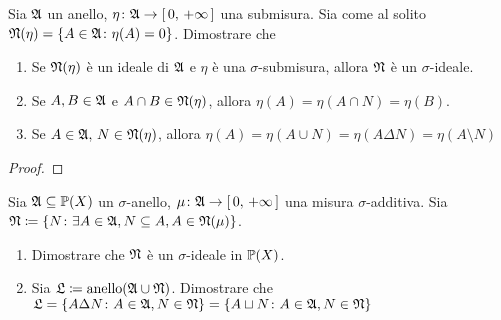 \documentclass[../EserciziIstituzioniAnalisi.tex]{subfiles}
\begin{document}
\begin{exercise}[2016-10-20]
  Sia $\mathfrak A$ un anello, $\eta\colon\mathfrak A\to\left[\,0,\,+\infty\,\right]$ una submisura. Sia come al solito $\mathfrak N(\eta)=\left\{A\in\mathfrak A\colon\eta(A)=0\right\}$. Dimostrare che
  \begin{enumerate}
    \item Se $\mathfrak N(\eta)$ è un ideale di $\mathfrak A$ e $\eta$ è una $\sigma$-submisura, allora $\mathfrak N$ è un $\sigma$-ideale.
    \item Se $A,B\in \mathfrak A$ e $A\cap B\in \mathfrak N(\eta)$, allora $\eta(A)=\eta(A\cap N)=\eta(B)$.
    \item Se $A\in \mathfrak A,\, N\in \mathfrak N(\eta)$, allora $\eta(A)=\eta(A\cup N)=\eta(A\Delta N)=\eta(A\setminus N)$
  \end{enumerate}
\end{exercise}
\begin{proof}
  
\end{proof}
\begin{exercise}[2016-10-20]
  Sia $\mathfrak A\subseteq\mathbb P(X)$ un $\sigma$-anello, $\mu\colon \mathfrak A\to\left[\,0,\,+\infty\,\right]$ una misura $\sigma$-additiva.
  Sia $\mathfrak N\coloneqq\left\{N\colon\exists A\in \mathfrak A, N\subseteq A, A\in \mathfrak N(\mu)\right\}$.

  \begin{enumerate}
    \item Dimostrare che $\mathfrak N$ è un $\sigma$-ideale in $\mathbb P(X)$.
    \item Sia $\mathfrak L\coloneqq\operatorname{anello}(\mathfrak A\cup\mathfrak N)$. Dimostrare che $\mathfrak L=\left\{A\Delta N\colon A\in\mathfrak A,N\in\mathfrak N\right\}=\left\{A\sqcup N\colon A\in\mathfrak A,N\in\mathfrak N\right\}$ 
  \end{enumerate}
\end{exercise}
\end{document}

